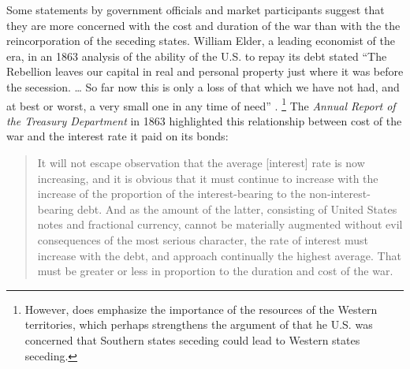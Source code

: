 Some statements by government officials and market participants suggest that they are more concerned with the cost and duration of the war than with the the reincorporation of the seceding states.
William Elder, a leading economist of the era, in an 1863 analysis of the ability of the U.S. to repay its debt stated ``The Rebellion leaves our capital in real and personal property just where it was before the secession. \dots{} So far now this is only a loss of that which we have not had, and at best or worst, a very small one in any time of need'' \parencite[19]{Elder1863}.%
\footnote{
  However, \textcite{Elder1863} does emphasize the importance of the resources of the Western territories, which perhaps strengthens the argument of  \textcite{Weingast1998} that he U.S. was concerned that Southern states seceding could lead to Western states seceding.
}
The \textit{Annual Report of the Treasury Department} in 1863 highlighted this relationship between cost of the war and the interest rate it paid on its bonds:
\begin{quote}
It will not escape observation that the average [interest] rate is now increasing, and it is obvious that it must continue to increase with the increase of the proportion of the interest-bearing to the non-interest-bearing debt.
And as the amount of the latter, consisting of United States notes and fractional currency, cannot be materially augmented without evil consequences of the most serious character, the rate of interest must increase with the debt, and approach continually the highest average.
That must be greater or less in proportion to the duration and cost of the war. \parencite[13]{Treasury1863}
\end{quote}

